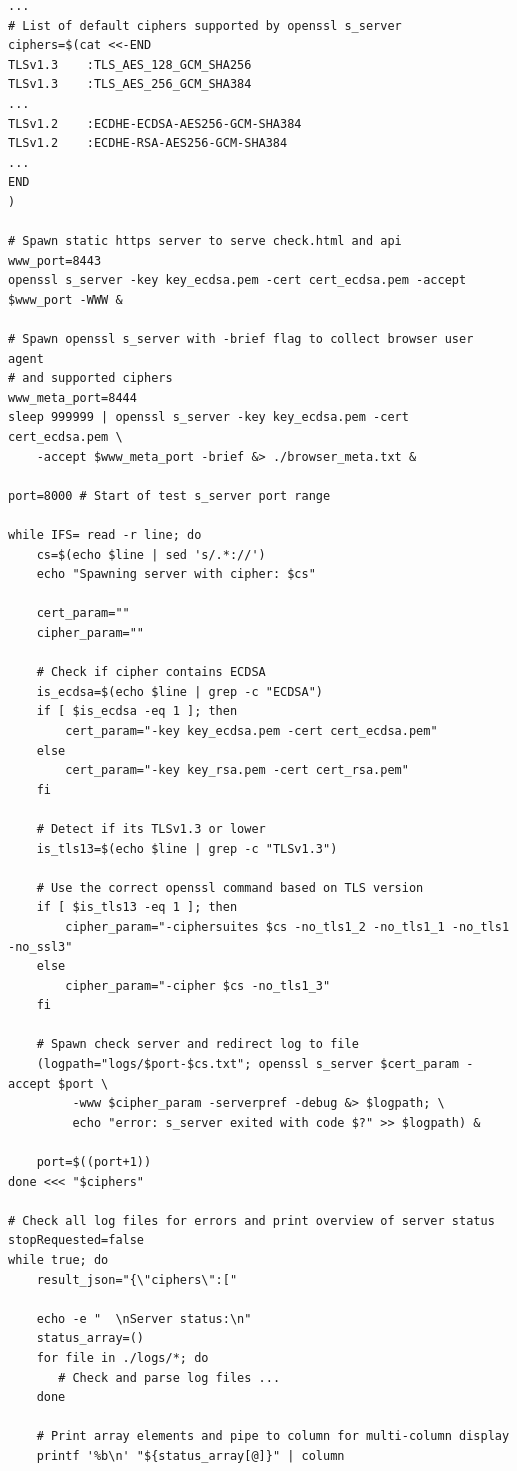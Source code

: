 \documentclass[12pt]{scrbook}
\begin{document}
\begin{verbatim}
...
# List of default ciphers supported by openssl s_server
ciphers=$(cat <<-END
TLSv1.3    :TLS_AES_128_GCM_SHA256
TLSv1.3    :TLS_AES_256_GCM_SHA384
...
TLSv1.2    :ECDHE-ECDSA-AES256-GCM-SHA384
TLSv1.2    :ECDHE-RSA-AES256-GCM-SHA384
...
END
)

# Spawn static https server to serve check.html and api
www_port=8443
openssl s_server -key key_ecdsa.pem -cert cert_ecdsa.pem -accept $www_port -WWW &

# Spawn openssl s_server with -brief flag to collect browser user agent
# and supported ciphers
www_meta_port=8444
sleep 999999 | openssl s_server -key key_ecdsa.pem -cert cert_ecdsa.pem \
    -accept $www_meta_port -brief &> ./browser_meta.txt &

port=8000 # Start of test s_server port range

while IFS= read -r line; do
    cs=$(echo $line | sed 's/.*://')
    echo "Spawning server with cipher: $cs"

    cert_param=""
    cipher_param=""

    # Check if cipher contains ECDSA
    is_ecdsa=$(echo $line | grep -c "ECDSA")
    if [ $is_ecdsa -eq 1 ]; then
        cert_param="-key key_ecdsa.pem -cert cert_ecdsa.pem"
    else
        cert_param="-key key_rsa.pem -cert cert_rsa.pem"
    fi

    # Detect if its TLSv1.3 or lower
    is_tls13=$(echo $line | grep -c "TLSv1.3")

    # Use the correct openssl command based on TLS version
    if [ $is_tls13 -eq 1 ]; then
        cipher_param="-ciphersuites $cs -no_tls1_2 -no_tls1_1 -no_tls1 -no_ssl3"
    else
        cipher_param="-cipher $cs -no_tls1_3"
    fi

    # Spawn check server and redirect log to file
    (logpath="logs/$port-$cs.txt"; openssl s_server $cert_param -accept $port \
         -www $cipher_param -serverpref -debug &> $logpath; \
         echo "error: s_server exited with code $?" >> $logpath) &

    port=$((port+1))
done <<< "$ciphers"

# Check all log files for errors and print overview of server status
stopRequested=false
while true; do
    result_json="{\"ciphers\":["

    echo -e "  \nServer status:\n"
    status_array=()
    for file in ./logs/*; do
       # Check and parse log files ...
    done

    # Print array elements and pipe to column for multi-column display
    printf '%b\n' "${status_array[@]}" | column


\end{verbatim}
\end{document}
